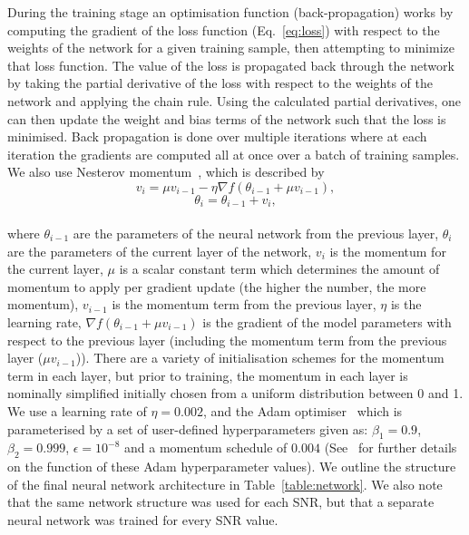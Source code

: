 %
%
During the training stage an optimisation function (back-propagation) works 
by computing the gradient of the loss function (Eq.~\ref{eq:loss}) with 
respect to the weights of the network for a given training sample, 
then attempting to minimize 
that loss function. The value of the loss is propagated back 
through the network by taking the partial derivative of the loss with respect 
to the weights of the network and applying the chain rule. 
Using the calculated partial 
derivatives, one can then update the weight and bias terms of the network such 
that the loss is minimised.  Back propagation is done over multiple 
iterations where at each iteration the gradients are computed all at once over 
a batch of training samples. We also use Nesterov momentum~\cite{dozat2016incorporating}, which is described by  
%
\begin{equation} \label{eq:nesterov1}
v_{i} = \mu v_{i-1} - \eta \nabla f(\theta_{i-1} + \mu v_{i-1}),
\end{equation}
%
\begin{equation} \label{eq:nesterov2}
\theta_{i} = \theta_{i-1} + v_{i},
\end{equation} \\
%
where $\theta_{i-1}$ are the parameters of the neural network from the 
previous layer, $\theta_{i}$ are the parameters of the current layer 
of the network, $v_{i}$ is the momentum for the current layer, 
$\mu$ is a scalar constant term which determines 
the amount of momentum to apply per gradient update 
(the higher the number, the more momentum), $v_{i-1}$ is the 
momentum term from the previous layer, $\eta$ is the 
learning rate, $\nabla f(\theta_{i-1} + \mu v_{i-1})$ is the 
gradient of the model parameters with respect to the previous 
layer (including the momentum term from the previous layer ($\mu v_{i-1}$)).
There are a variety of 
initialisation schemes for the momentum term in each layer, but prior to 
training, the momentum in each layer is nominally simplified initially 
chosen from a uniform distribution between 0 and 1.
We use a learning rate of $\eta = 0.002$, and the Adam
optimiser~\cite{2014arXiv1412.6980K} 
which is parameterised by a set of user-defined hyperparameters given as: 
$\beta_{1}=0.9$, $\beta_{2}=0.999$, $\epsilon = 10^{-8}$ and a momentum
schedule of $0.004$ (See~\cite{2014arXiv1412.6980K} for 
further details on the function of 
these Adam hyperparameter values). We outline 
the structure of the final neural network architecture 
in Table~\ref{table:network}. We also note that the same 
network structure was used for each \ac{SNR}, but that a separate neural 
network was trained for every \ac{SNR} value.

